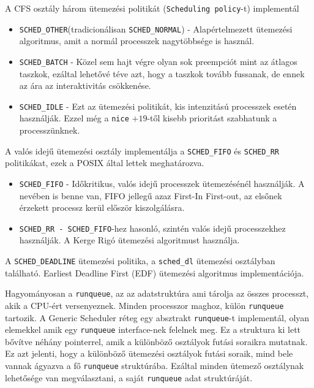 

A CFS osztály három ütemezési politikát (\texttt{Scheduling policy}-t) implementál
\begin{itemize}
	\item \texttt{SCHED\_OTHER}(tradicionálisan  \texttt{SCHED\_NORMAL}) - Alapértelmezett ütemezési algoritmus, amit a normál processzek nagytöbbsége is használ.

    \item \texttt{SCHED\_BATCH} - Közel sem hajt végre olyan sok preempciót mint az átlagos taszkok, ezáltal lehetővé téve azt, hogy a taszkok tovább fussanak, de ennek az ára az interaktivitás csökkenése.
        
	\item \texttt{SCHED\_IDLE} - Ezt az ütemezési politikát, kis intenzitású processzek esetén használják. Ezzel még a \texttt{nice} $+19$-től kisebb prioritást szabhatunk a processzünknek.
\end{itemize}
A valós idejű ütemezési osztály implementálja a \texttt{SCHED\_FIFO} és \texttt{SCHED\_RR} politikákat, ezek a POSIX által lettek meghatározva.
\begin{itemize}
	\item \texttt{SCHED\_FIFO} - Időkritikus, valós idejű processzek ütemezésénél használják. A nevében is benne van, FIFO jellegű azaz First-In First-out, az elsőnek érzekett processz kerül először kiszolgálásra. 

	\item \texttt{SCHED\_RR - SCHED\_FIFO}-hez hasonló, szintén valós idejű processzekhez használják. A Kerge Rigó ütemezési algoritmust használja.
\end{itemize}

A \texttt{SCHED\_DEADLINE} ütemezési politika, a \texttt{sched\_dl} ütemezési osztályban található.  Earliest Deadline First (EDF) ütemezési algoritmus implementációja.


Hagyományosan a \texttt{runqueue}, az az adatstruktúra ami tárolja az összes processzt, akik a CPU-ért versenyeznek.
Minden processzor maghoz, külön \texttt{runqueue} tartozik. 
A Generic Scheduler réteg egy absztrakt \texttt{runqueue}-t implementál, olyan elemekkel amik egy \texttt{runqueue} interface-nek felelnek meg.
Ez a struktura ki lett bővítve néhány pointerrel, amik a különböző osztályok futási soraikra mutatnak. Ez azt jelenti, hogy a különböző ütemezési osztályok futási soraik, mind bele vannak ágyazva a fő \texttt{runqueue} struktúrába. Ezáltal minden ütemező osztálynak lehetősége van megválasztani, a saját \texttt{runqueue} adat struktúráját. 

